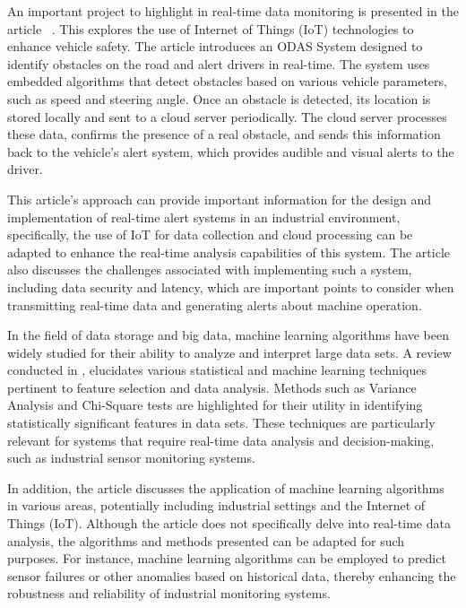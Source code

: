 An important project to highlight in real-time data monitoring is presented in the article ~\cite{Umakirthika2018}. This explores the use of Internet of Things (IoT) technologies to enhance vehicle safety. The article introduces an \gls{ODAS} System designed to identify obstacles on the road and alert drivers in real-time. The system uses embedded algorithms that detect obstacles based on various vehicle parameters, such as speed and steering angle. Once an obstacle is detected, its location is stored locally and sent to a cloud server periodically. The cloud server processes these data, confirms the presence of a real obstacle, and sends this information back to the vehicle's alert system, which provides audible and visual alerts to the driver.

This article's approach can provide important information for the design and implementation of real-time alert systems in an industrial environment, specifically, the use of IoT for data collection and cloud processing can be adapted to enhance the real-time analysis capabilities of this system. The article also discusses the challenges associated with implementing such a system, including data security and latency, which are important points to consider when transmitting real-time data and generating alerts about machine operation.

In the field of data storage and big data, machine learning algorithms have been widely studied for their ability to analyze and interpret large data sets. A review conducted in \cite{sarker2021machine}, elucidates various statistical and machine learning techniques pertinent to feature selection and data analysis. Methods such as Variance Analysis and Chi-Square tests are highlighted for their utility in identifying statistically significant features in data sets. These techniques are particularly relevant for systems that require real-time data analysis and decision-making, such as industrial sensor monitoring systems.

In addition, the article discusses the application of machine learning algorithms in various areas, potentially including industrial settings and the Internet of Things (IoT). Although the article does not specifically delve into real-time data analysis, the algorithms and methods presented can be adapted for such purposes. For instance, machine learning algorithms can be employed to predict sensor failures or other anomalies based on historical data, thereby enhancing the robustness and reliability of industrial monitoring systems.

